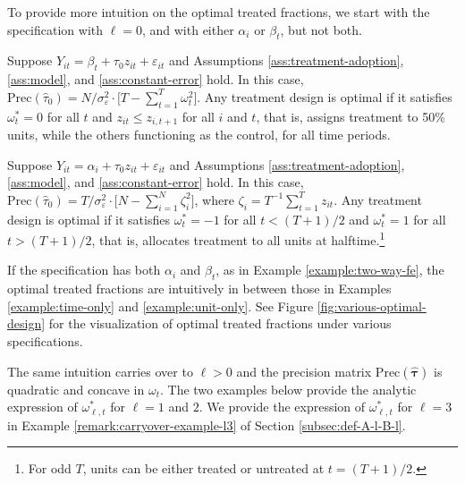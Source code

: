 	{\blue 
	
	To provide more intuition on the optimal treated fractions, we start with the specification with $\ell = 0$, and with either  $\alpha_i$ or $\beta_t$, but not both. 
	
	\begin{example}[Time Fixed Effects Only and $\ell = 0$]\label{example:time-only}
Suppose $Y_{it} = \beta_t + \tau_0 z_{it} + \varepsilon_{it}$ and Assumptions \ref{ass:treatment-adoption}, \ref{ass:model}, and \ref{ass:constant-error} hold. In this case,
$\mathrm{Prec}(\hat{\tau}_0)  = {N}/{\sigma_\varepsilon^2 } \cdot \big[T - \sum_{t=1}^T \omega_t^2  \big]$.
Any treatment design is optimal if it satisfies $\omega^\ast_t = 0$ for all $t$ and $z_{it} \leq z_{i,t+1}$ for all $i$ and $t$, that is, assigns treatment to 50\% units, while the others functioning as the control, for all time periods. 
\end{example}

\begin{example}[Unit Fixed Effects Only and $\ell = 0$]\label{example:unit-only}
Suppose	$Y_{it} = \alpha_i + \tau_0 z_{it} + \varepsilon_{it}$ and Assumptions \ref{ass:treatment-adoption}, \ref{ass:model}, and \ref{ass:constant-error} hold.  In this case,
$\mathrm{Prec}(\hat{\tau}_0) = {T}/{\sigma_\varepsilon^2 } \cdot \big[N - \sum_{i=1}^N \zeta_i^2 \big]$, 
where $\zeta_i = T^{-1} \sum_{t=1}^T z_{it}$.
Any treatment design is optimal if it satisfies $\omega^\ast_t = -1$ for all $t < (T+1)/2$ and $\omega^\ast_t = 1$ for all $t > (T+1)/2$, that is, allocates treatment to all units at halftime.\footnote{For odd $T$, units can be either treated or untreated at $t = (T+1)/2$.} 
\end{example}

    }


	If the specification has both $\alpha_i$ and $\beta_t$, as in Example \ref{example:two-way-fe}, 
	the optimal treated fractions are intuitively in between those in Examples \ref{example:time-only} and \ref{example:unit-only}. See Figure \ref{fig:various-optimal-design} for the visualization of optimal treated fractions under various specifications.


	
	The same intuition carries over to $\ell > 0$ and the precision matrix $\mathrm{Prec}(\hat{\bm{\tau}})$ is quadratic and concave in $\omega_t$. The two examples below provide the analytic expression of $\omega^\ast_{\ell,t}$ for $\ell = 1$ and $2$. We provide the expression of $\omega_{\ell,t}^\ast$ for $\ell = 3$ in Example \ref{remark:carryover-example-l3} of Section \ref{subsec:def-A-l-B-l}. 
	

